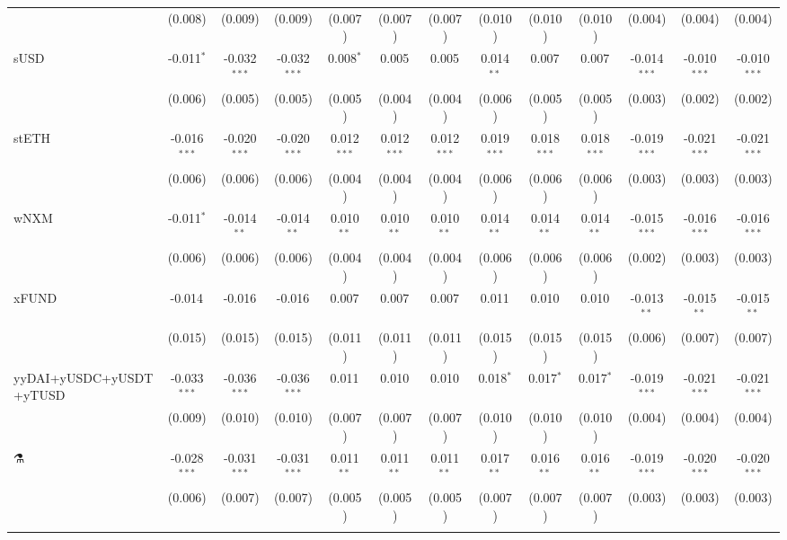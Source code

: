 \begin{table}[!htbp]
\begin{tabular}{@{\extracolsep{5pt}}lcccccccccccc}
  & (0.008) & (0.009) & (0.009) & (0.007) & (0.007) & (0.007) & (0.010) & (0.010) & (0.010) & (0.004) & (0.004) & (0.004) \\
 sUSD & -0.011$^{*}$ & -0.032$^{***}$ & -0.032$^{***}$ & 0.008$^{*}$ & 0.005$^{}$ & 0.005$^{}$ & 0.014$^{**}$ & 0.007$^{}$ & 0.007$^{}$ & -0.014$^{***}$ & -0.010$^{***}$ & -0.010$^{***}$ \\
  & (0.006) & (0.005) & (0.005) & (0.005) & (0.004) & (0.004) & (0.006) & (0.005) & (0.005) & (0.003) & (0.002) & (0.002) \\
 stETH & -0.016$^{***}$ & -0.020$^{***}$ & -0.020$^{***}$ & 0.012$^{***}$ & 0.012$^{***}$ & 0.012$^{***}$ & 0.019$^{***}$ & 0.018$^{***}$ & 0.018$^{***}$ & -0.019$^{***}$ & -0.021$^{***}$ & -0.021$^{***}$ \\
  & (0.006) & (0.006) & (0.006) & (0.004) & (0.004) & (0.004) & (0.006) & (0.006) & (0.006) & (0.003) & (0.003) & (0.003) \\
 wNXM & -0.011$^{*}$ & -0.014$^{**}$ & -0.014$^{**}$ & 0.010$^{**}$ & 0.010$^{**}$ & 0.010$^{**}$ & 0.014$^{**}$ & 0.014$^{**}$ & 0.014$^{**}$ & -0.015$^{***}$ & -0.016$^{***}$ & -0.016$^{***}$ \\
  & (0.006) & (0.006) & (0.006) & (0.004) & (0.004) & (0.004) & (0.006) & (0.006) & (0.006) & (0.002) & (0.003) & (0.003) \\
 xFUND & -0.014$^{}$ & -0.016$^{}$ & -0.016$^{}$ & 0.007$^{}$ & 0.007$^{}$ & 0.007$^{}$ & 0.011$^{}$ & 0.010$^{}$ & 0.010$^{}$ & -0.013$^{**}$ & -0.015$^{**}$ & -0.015$^{**}$ \\
  & (0.015) & (0.015) & (0.015) & (0.011) & (0.011) & (0.011) & (0.015) & (0.015) & (0.015) & (0.006) & (0.007) & (0.007) \\
 yyDAI+yUSDC+yUSDT+yTUSD & -0.033$^{***}$ & -0.036$^{***}$ & -0.036$^{***}$ & 0.011$^{}$ & 0.010$^{}$ & 0.010$^{}$ & 0.018$^{*}$ & 0.017$^{*}$ & 0.017$^{*}$ & -0.019$^{***}$ & -0.021$^{***}$ & -0.021$^{***}$ \\
  & (0.009) & (0.010) & (0.010) & (0.007) & (0.007) & (0.007) & (0.010) & (0.010) & (0.010) & (0.004) & (0.004) & (0.004) \\
 ⚗️ & -0.028$^{***}$ & -0.031$^{***}$ & -0.031$^{***}$ & 0.011$^{**}$ & 0.011$^{**}$ & 0.011$^{**}$ & 0.017$^{**}$ & 0.016$^{**}$ & 0.016$^{**}$ & -0.019$^{***}$ & -0.020$^{***}$ & -0.020$^{***}$ \\
  & (0.006) & (0.007) & (0.007) & (0.005) & (0.005) & (0.005) & (0.007) & (0.007) & (0.007) & (0.003) & (0.003) & (0.003) \\
\hline \\[-1.8ex]

\end{tabular}
\end{table}
